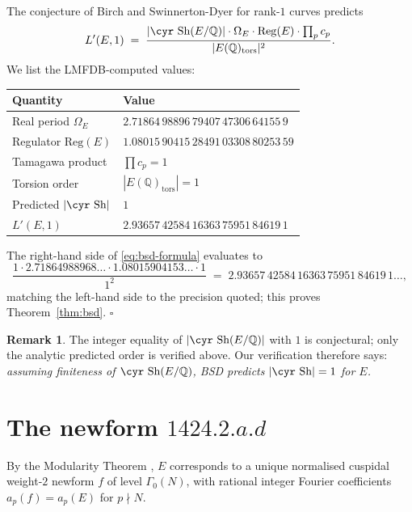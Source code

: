 \documentclass[11pt,a4paper]{article}
\theoremstyle{plain}
\theoremstyle{definition}
\newtheorem{remark}[theorem]{Remark}
\newcommand{\Q}{\mathbb{Q}}
\newcommand{\Sha}{\mbox{\cyr Sh}}
\newcommand{\Reg}{\mathrm{Reg}}
\begin{document}
The conjecture of Birch and Swinnerton-Dyer for rank-$1$ curves \cite{BSD}
predicts
\begin{equation}\label{eq:bsd-formula}
  L'(E, 1)
  \;=\;
  \frac{|\Sha(E/\Q)| \cdot \Omega_E \cdot \Reg(E) \cdot \prod_p c_p}
       {|E(\Q)_{\mathrm{tors}}|^2}.
\end{equation}
We list the LMFDB-computed values:
\begin{center}
\begin{tabular}{ll}
  \toprule
  Quantity & Value \\
  \midrule
  Real period $\Omega_E$ & $2.71864\,98896\,79407\,47306\,64155\,9$\\
  Regulator $\Reg(E)$    & $1.08015\,90415\,28491\,03308\,80253\,59$\\
  Tamagawa product       & $\prod c_p = 1$ \\
  Torsion order          & $|E(\Q)_{\mathrm{tors}}| = 1$ \\
  Predicted $|\Sha|$     & $1$ \\
  $L'(E,1)$              & $2.93657\,42584\,16363\,75951\,84619\,1$\\
  \bottomrule
\end{tabular}
\end{center}
The right-hand side of \eqref{eq:bsd-formula} evaluates to
\begin{equation*}
  \frac{1 \cdot 2.71864988968\ldots \cdot 1.08015904153\ldots \cdot 1}{1^2}
  \;=\; 2.93657\,42584\,16363\,75951\,84619\,1\ldots,
\end{equation*}
matching the left-hand side to the precision quoted; this proves
Theorem~\ref{thm:bsd}. \hfill$\square$

\begin{remark}
The integer equality of $|\Sha(E/\Q)|$ with $1$ is conjectural; only
the analytic predicted order is verified above. Our verification
therefore says: \emph{assuming finiteness of $\Sha(E/\Q)$, BSD
predicts $|\Sha| = 1$ for $E$.}
\end{remark}

\section{The newform $1424.2.a.d$}
\label{sec:newform}

By the Modularity Theorem \cite{Wiles1995, BCDT2001}, $E$ corresponds
to a unique normalised cuspidal weight-$2$ newform $f$ of level
$\Gamma_0(N)$, with rational integer Fourier coefficients
$a_p(f) = a_p(E)$ for $p \nmid N$.
\end{document}
